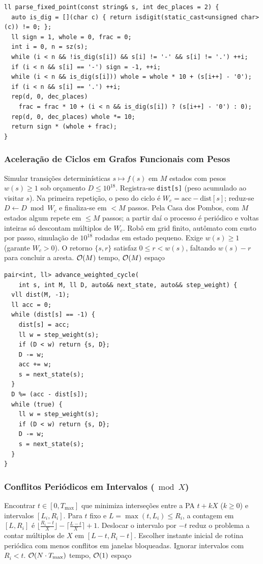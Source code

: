 \begin{lstlisting}
ll parse_fixed_point(const string& s, int dec_places = 2) {
  auto is_dig = [](char c) { return isdigit(static_cast<unsigned char>(c)) != 0; };
  ll sign = 1, whole = 0, frac = 0;
  int i = 0, n = sz(s);
  while (i < n && !is_dig(s[i]) && s[i] != '-' && s[i] != '.') ++i;
  if (i < n && s[i] == '-') sign = -1, ++i;
  while (i < n && is_dig(s[i])) whole = whole * 10 + (s[i++] - '0');
  if (i < n && s[i] == '.') ++i;
  rep(d, 0, dec_places)
    frac = frac * 10 + (i < n && is_dig(s[i]) ? (s[i++] - '0') : 0);
  rep(d, 0, dec_places) whole *= 10;
  return sign * (whole + frac);
}
\end{lstlisting}

\subsubsection{Aceleração de Ciclos em Grafos Funcionais com Pesos}
\algobox
  {Simular transições determinísticas $s \mapsto f(s)$ em $M$ estados com pesos $w(s) \ge 1$ sob orçamento $D \le 10^{18}$.}
  {Registra-se \texttt{dist[s]} (peso acumulado ao visitar $s$). Na primeira repetição, o peso do ciclo é $W_c = \text{acc} - \text{dist}[s]$; reduz-se $D \leftarrow D \bmod W_c$ e finaliza-se em $< M$ passos.}
  {Pela Casa dos Pombos, com $M$ estados algum repete em $\le M$ passos; a partir daí o processo é periódico e voltas inteiras só descontam múltiplos de $W_c$.}
  {Robô em grid finito, autômato com custo por passo, simulação de $10^{18}$ rodadas em estado pequeno.}
  {Exige $w(s) \ge 1$ (garante $W_c > 0$). O retorno $\{s, r\}$ satisfaz $0 \le r < w(s)$, faltando $w(s) - r$ para concluir a aresta.}
  {$\mathcal{O}(M)$ tempo, $\mathcal{O}(M)$ espaço}

\begin{lstlisting}
pair<int, ll> advance_weighted_cycle(
    int s, int M, ll D, auto&& next_state, auto&& step_weight) {
  vll dist(M, -1);
  ll acc = 0;
  while (dist[s] == -1) {
    dist[s] = acc;
    ll w = step_weight(s);
    if (D < w) return {s, D};
    D -= w;
    acc += w;
    s = next_state(s);
  }
  D %= (acc - dist[s]);
  while (true) {
    ll w = step_weight(s);
    if (D < w) return {s, D};
    D -= w;
    s = next_state(s);
  }
}
\end{lstlisting}

\subsubsection{Conflitos Periódicos em Intervalos ($\bmod X$)}
\algobox
  {Encontrar $t \in [0, T_{\max}]$ que minimiza interseções entre a PA $t + kX$ ($k \ge 0$) e intervalos $[L_i, R_i]$.}
  {Para $t$ fixo e $L = \max(t, L_i) \le R_i$, a contagem em $[L, R_i]$ é $\lfloor \frac{R_i - t}{X} \rfloor - \lceil \frac{L - t}{X} \rceil + 1$.}
  {Deslocar o intervalo por $-t$ reduz o problema a contar múltiplos de $X$ em $[L - t, R_i - t]$.}
  {Escolher instante inicial de rotina periódica com menos conflitos em janelas bloqueadas.}
  {Ignorar intervalos com $R_i < t$.}
  {$\mathcal{O}(N \cdot T_{\max})$ tempo, $\mathcal{O}(1)$ espaço}

